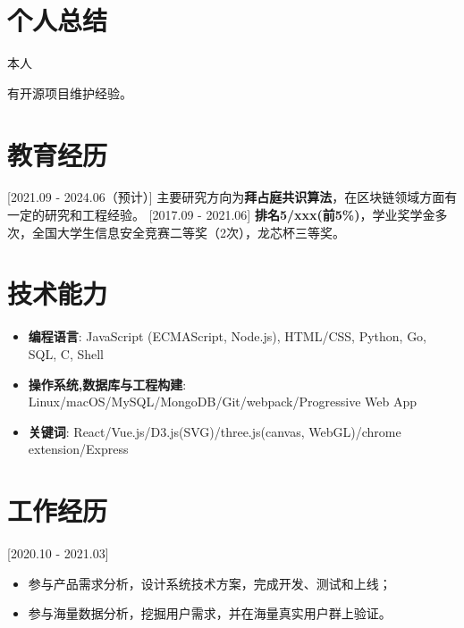 \documentclass{resume}
\begin{document}

\ResumeTitle

\section{个人总结}

本人

有开源项目维护经验。

\section{教育经历}
[2021.09 - 2024.06（预计）]
主要研究方向为\textbf{拜占庭共识算法}，在区块链领域方面有一定的研究和工程经验。
[2017.09 - 2021.06]
\textbf{排名5/xxx(前5\%)}，学业奖学金多次，全国大学生信息安全竞赛二等奖（2次），龙芯杯三等奖。


\section{技术能力}
\begin{itemize}
  \item \textbf{编程语言}: JavaScript (ECMAScript, Node.js), HTML/CSS, Python, Go, SQL, C, Shell
  \item \textbf{操作系统,数据库与工程构建}: Linux/macOS/MySQL/MongoDB/Git/webpack/Progressive Web App
  \item \textbf{关键词}: React/Vue.js/D3.js(SVG)/three.js(canvas, WebGL)/chrome extension/Express
\end{itemize}

\section{工作经历}

[2020.10 - 2021.03] 
\begin{itemize}
  \item 参与产品需求分析，设计系统技术方案，完成开发、测试和上线；
  \item 参与海量数据分析，挖掘用户需求，并在海量真实用户群上验证。
\end{itemize}
\end{document}
